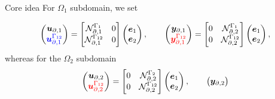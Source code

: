 \documentclass[aspectratio=169]{ISAE-Beamer}
\begin{document}
\begin{frame}{Core idea}
For $\Omega_1$ subdomain, we set

\begin{equation*} 
\begin{pmatrix}
\bm{u}_{\partial, 1}\\
\textcolor{blue}{\bm{u}_{\partial, 1}^{\Gamma_{12}}}\\
\end{pmatrix} = \begin{bmatrix}
\mathcal{N}_{\partial, 1}^{\Gamma_1} & 0\\
\mathcal{N}_{\partial, 1}^{\Gamma_{12}} & 0 \\
\end{bmatrix} \begin{pmatrix}
\bm{e}_1 \\ \bm{e}_2
\end{pmatrix}, \qquad
\begin{pmatrix}
\bm{y}_{\partial, 1}\\
\textcolor{red}{\bm{y}_{\partial, 1}^{\Gamma_{12}}} \\
\end{pmatrix} = \begin{bmatrix}
0 & \mathcal{N}_{\partial, 2}^{\Gamma_1} \\
0 & \mathcal{N}_{\partial, 2}^{\Gamma_{12}} \\
\end{bmatrix} \begin{pmatrix}
\bm{e}_1 \\ \bm{e}_2
\end{pmatrix},
\end{equation*}
whereas for the $\Omega_2$ subdomain
\begin{equation*}
\begin{pmatrix}
\bm{u}_{\partial, 2}\\
\textcolor{red}{\bm{u}_{\partial, 2}^{\Gamma_{12}}}\\
\end{pmatrix} = \begin{bmatrix}
0 & \mathcal{N}_{\partial, 2}^{\Gamma_2}\\
0 & \mathcal{N}_{\partial, 2}^{\Gamma_{12}} \\
\end{bmatrix} \begin{pmatrix}
\bm{e}_1 \\ \bm{e}_2
\end{pmatrix}, \qquad
\begin{pmatrix}
\bm{y}_{\partial, 2}\\

\end{pmatrix}
\end{equation*}
\end{frame}
\end{document}
